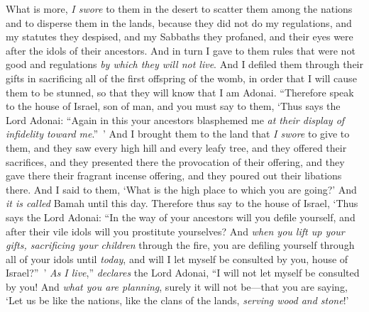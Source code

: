 \begin{biblechapter}
\verse What is more, \textit{I swore} to them in the desert to scatter them among the nations and to disperse them in the lands,
\verse because they did not do my regulations, and my statutes they despised, and my Sabbaths they profaned, and their eyes were after the idols of their ancestors.
\verse And in turn I gave to them rules that were not good and regulations \textit{by which they will not live}.
\verse And I defiled them through their gifts in sacrificing all of the first offspring of the womb, in order that I will cause them to be stunned, so that they will know that I am Adonai.
\verse “Therefore speak to the house of Israel, son of man, and you must say to them, ‘Thus says the Lord Adonai: “Again in this your ancestors blasphemed me \textit{at their display of infidelity toward me}.” ’
\verse And I brought them to the land that \textit{I swore} to give to them, and they saw every high hill and every leafy tree, and they offered their sacrifices, and they presented there the provocation of their offering, and they gave there their fragrant incense offering, and they poured out their libations there.
\verse And I said to them, ‘What is the high place to which you are going?’ And \textit{it is called} Bamah until this day.
\verse Therefore thus say to the house of Israel, ‘Thus says the Lord Adonai: “In the way of your ancestors will you defile yourself, and after their vile idols will you prostitute yourselves?
\verse And \textit{when you lift up your gifts, sacrificing your children} through the fire, you are defiling yourself through all of your idols until \textit{today}, and will I let myself be consulted by you, house of Israel?” ’ \textit{As I live},” \textit{declares} the Lord Adonai, “I will not let myself be consulted by you!
\verse And \textit{what you are planning}, surely it will not be—that you are saying, ‘Let us be like the nations, like the clans of the lands, \textit{serving wood and stone}!’

\end{biblechapter}
